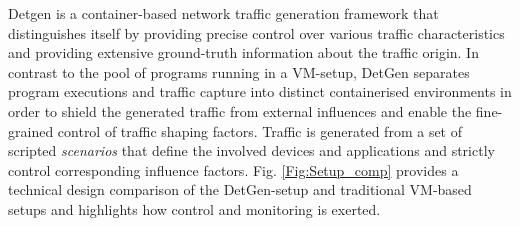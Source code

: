 \documentclass[runningheads]{llncs}
\begin{document}
Detgen is a container-based network traffic generation framework that distinguishes itself by providing precise control over various traffic characteristics and providing extensive ground-truth information about the traffic origin. %
In contrast to the pool of programs running in a VM-setup, DetGen separates program executions and traffic capture into distinct containerised environments in order to shield the generated traffic from external influences and enable the fine-grained control of traffic shaping factors.
Traffic is generated from a set of scripted \textit{scenarios} that define the involved devices and applications and strictly control corresponding influence factors. 
Fig. \ref{Fig:Setup_comp} provides a technical design comparison of the DetGen-setup and traditional VM-based setups and highlights how control and monitoring is exerted.
\end{document}
